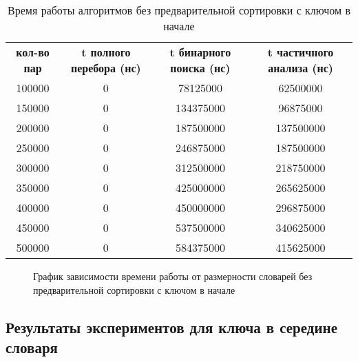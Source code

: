 \newpage
\begin{table}[ph!]
  \begin{center}
    \captionsetup{justification=raggedright}
     \caption{Время работы алгоритмов без предварительной сортировки с ключом в начале}
    \label{tab:workcost_classic}
    \begin{tabular}{c|c|c|c}
      \textbf{кол-во пар} & \textbf{t полного перебора (нс)}  & \textbf{t бинарного поиска (нс)} & \textbf{t частичного анализа (нс)}\\
	100000 & 0 & 78125000 & 62500000\\
	150000 & 0 & 134375000 & 96875000\\
	200000 & 0 & 187500000 & 137500000\\
	250000 & 0 & 246875000 & 187500000\\
	300000 & 0 & 312500000 & 218750000\\
	350000 & 0 & 425000000 & 265625000\\
	400000 & 0 & 450000000 & 296875000\\
	450000 & 0 & 537500000 & 340625000\\
	500000 & 0 & 584375000 & 415625000\\
      \hline	
    \end{tabular}
  \end{center}
\end{table}

\begin{figure}[ph!]
	\caption{График зависимости времени работы от размерности словарей без предварительной сортировки с ключом в начале}
\end{figure}

\newpage
\subsection{Результаты экспериментов для ключа в середине словаря}

